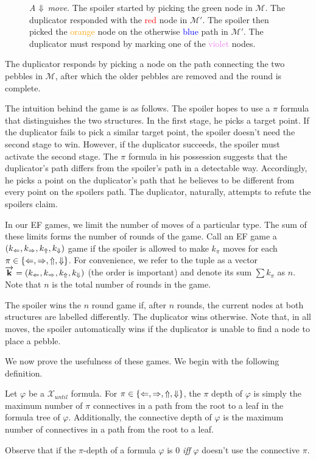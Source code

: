 \documentclass[a4paper,UKenglish,cleveref, autoref, thm-restate, numberwithinsect]{lipics-v2021}
\def\Larrow{\ensuremath\mathord{\Leftarrow}}
\def\Rarrow{\ensuremath\mathord{\Rightarrow}}
\def\Uarrow{\ensuremath\mathord{\Uparrow}}
\def\Darrow{\ensuremath\mathord{\Downarrow}}
\newcommand{\myvec}[1]{\overrightarrow{\mathbf{#1}}}
\begin{document}
\begin{figure}[h]
    \centering
    \caption{\emph{A $\Darrow$ move.} The spoiler started by picking the \textcolor{OliveGreen}{green} node in $\mathcal{M}$. The duplicator responded with the \textcolor{red}{red} node in $\mathcal{M}'$. The spoiler then picked the \textcolor{orange}{orange} node on the otherwise \textcolor{blue}{blue} path in $\mathcal{M}'$. The duplicator must respond by marking one of the \textcolor{violet}{violet} nodes.}
    \label{efgame-intro-fig}
\end{figure}

The duplicator responds by picking a node on the path connecting the two pebbles in $\mathcal{M}$, after which the older pebbles are removed and the round is complete.

The intuition behind the game is as follows. The spoiler hopes to use a $\pi$ formula that distinguishes the two structures. In the first stage, he picks a target point. If the duplicator fails to pick a similar target point, the spoiler doesn't need the second stage to win. However, if the duplicator succeeds, the spoiler must activate the second stage. The $\pi$ formula in his possession suggests that the duplicator's path differs from the spoiler's path in a detectable way. Accordingly, he picks a point on the duplicator's path that he believes to be different from every point on the spoilers path. The duplicator, naturally, attempts to refute the spoilers claim.

In our EF games, we limit the number of moves of a particular type. The sum of these limits forms the number of rounds of the game. Call an EF game a $(k_{\Larrow}, k_{\Rarrow}, k_{\Uarrow}, k_{\Darrow})$ game if the spoiler is allowed to make $k_\pi$ moves for each $\pi \in \{\Larrow, \Rarrow, \Uarrow, \Darrow\}$. For convenience, we refer to the tuple as a vector $\myvec{k} = (k_{\Larrow}, k_{\Rarrow}, k_{\Uarrow}, k_{\Darrow})$ (the order is important) and denote its sum $\sum k_\pi$ as $n$. Note that $n$ is the total number of rounds in the game.

The spoiler wins the $n$ round game if, after $n$ rounds, the current nodes at both structures are labelled differently. The duplicator wins otherwise. Note that, in all moves, the spoiler automatically wins if the duplicator is unable to find a node to place a pebble.

We now prove the usefulness of these games. We begin with the following definition.
\begin{definition}
    Let $\varphi$ be a $\mathcal{X}_{until}$ formula. For $\pi \in \{\Larrow, \Rarrow, \Uarrow, \Darrow\}$, the $\pi$ depth of $\varphi$ is simply the maximum number of $\pi$ connectives in a path from the root to a leaf in the formula tree of $\varphi$. Additionally, the connective depth of $\varphi$ is the maximum number of connectives in a path from the root to a leaf.
\end{definition}
Observe that if the $\pi$-depth of a formula $\varphi$ is $0$ \textit{iff} $\varphi$ doesn't use the connective $\pi$.
\end{document}

